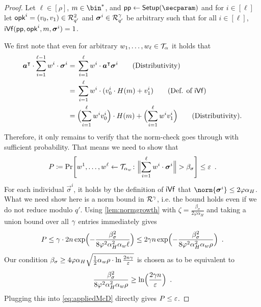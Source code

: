 \begin{proof}
  Let $\ell\in[\rho]$, $m\in\bin^*$, and $\params\gets\setup(\secparam)$ and for $i\in[\ell]$ let $\mathsf{opk}^i=(v_0,v_1) \in \mathcal{R}_{q'}^2$ and $\boldsymbol{\sigma}^i \in \mathcal{R}_{q'}^\gamma$ be arbitrary such that for all $i\in[\ell]$, $\mathsf{iVf}(\mathsf{pp},\mathsf{opk}^i,m,\boldsymbol{\sigma}^i)=1$.
  
  We first note that even for arbitrary $w_1,\dots,w_\ell \in \mathcal{T}_\alpha$ it holds that
  \begin{align*}
    \vec{a}^\transpose\cdot \sum_{i=1}^{\ell-1}w^i\cdot\vec{\sigma}^i
    ={}&\sum_{i=1}^{\ell}w^i\cdot\vec{a}^\transpose\vec{\sigma}^i \tag{Distributivity}\\
    ={}&\sum_{i=1}^{\ell}w^i\cdot(v^i_0\cdot H(m)+v^i_1) \tag{Def. of $\iverify$}\\
    ={}&\Bigl(\sum_{i=1}^{\ell}w^iv^i_0\Bigr)\cdot H(m)+ \Bigl(\sum_{i=1}^{\ell}w^iv^i_1\Bigr) \tag{Distributivity}.
  \end{align*}
  Therefore, it only remains to verify that the norm-check goes through with sufficient probability.
  That means we need to show that
  \[
    P\coloneqq \Pr\mleft[
      w^1,\dots,w^\ell\gets \tern_{\alpha_w}
      \colon
      \Bigl\Vert\sum_{i=1}^{\ell} w^i\cdot\vec{\sigma}^i\Bigr\Vert > \beta_\sigma\mright] \leq \errorbound \enspace.
  \]
  For each individual $\vec{\sigma}^i$, it holds by the definition of $\mathsf{iVf}$ that $\norm{\vec{\sigma}^i} \leq 2\varphi\alpha_H$.
  What we need show here is a norm bound in $\mathcal{R}^\gamma$, i.e. the bound holds even if we do not reduce modulo $q'$.
  Using \autoref{lem:normgrowth} with $\zeta = \tfrac{\beta_\sigma}{2\varphi\alpha_H}$ and taking a union bound over all $\gamma$ entries immediately gives
  \begin{align}\label{eq:appliedMcD}
   P \leq \gamma\cdot 2n\exp\Bigl(-\frac{\beta_\sigma^2}{8\varphi^2\alpha_H^2\alpha_w\ell}\Bigr) \leq 2\gamma n\exp\Bigl(-\frac{\beta_\sigma^2}{8\varphi^2\alpha_H^2\alpha_w\rho}\Bigr)\enspace.
  \end{align}
Our condition $\beta_\sigma \geq 4\varphi\alpha_H\sqrt{\tfrac{1}{2}\alpha_w\rho \cdot \ln\tfrac{2n\gamma}{\varepsilon}}$ is chosen as to be equivalent to
\[
 \frac{\beta_\sigma^2}{8\varphi^2\alpha^2_H\alpha_w\rho} \geq \ln\Bigl( \frac{2\gamma n}{\varepsilon} \Bigr)\enspace.
\]
Plugging this into \autoref{eq:appliedMcD} directly gives $P \leq \varepsilon$.

\end{proof}
